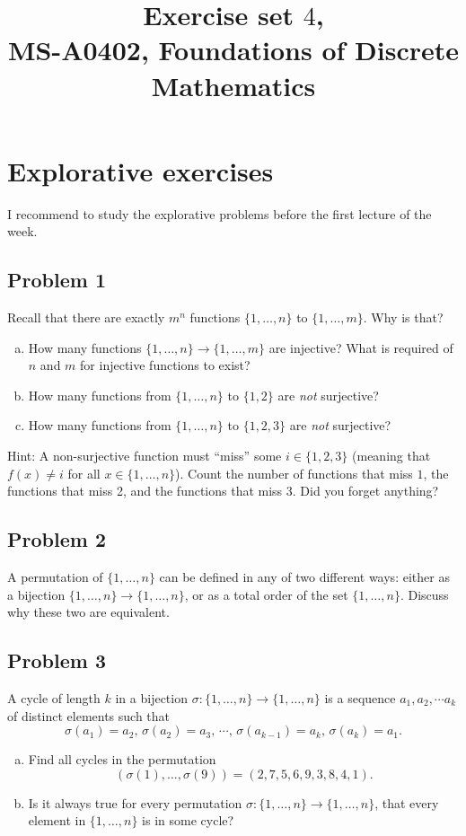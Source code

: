 \documentclass{amsart}
\title{Exercise set $4$, \\ MS-A0402, Foundations of Discrete Mathematics}
\theoremstyle{definition} \newtheorem*{definition}{Definition}
\theoremstyle{remark} \newtheorem*{ex}{Example}
\begin{document}
\hspace{-1cm}
\maketitle
 
\section*{Explorative exercises}
I recommend to study the explorative problems before the first lecture of the week.

\subsection*{Problem 1} 
Recall that there are exactly $m^n$ functions $\{1,\dots ,n\}$ to $\{1,\dots ,m\}$. Why is that?
\begin{enumerate}[a)]
\item How many functions $\{1,\dots ,n\}\to\{1,\dots ,m\}$ are injective? What is required of $n$ and $m$ for injective functions to exist?
\item How many functions from $\{1,\dots ,n\}$ to $\{1,2\}$ are {\em not} surjective?
\item How many functions from $\{1,\dots ,n\}$ to $\{1,2,3\}$ are {\em not} surjective? 
\end{enumerate}

Hint: A non-surjective function must ``miss'' some $i\in\{1,2,3\}$ (meaning that $f(x)\neq i$ for all $x\in \{1,\dots ,n\}$). Count the number of functions that miss $1$, the functions that miss 2, and the functions that miss 3. Did you forget anything?

\subsection*{Problem 2} 
A permutation of $\{1,\dots, n \}$ can be defined in any of two different ways: either as a bijection $\{1,\dots, n \}\to \{1,\dots, n \}$, or as a total order of the set $\{1,\dots, n \}$. Discuss why these two are equivalent.


\subsection*{Problem 3} 
A cycle of length $k$ in a bijection $\sigma: \{1,\dots, n \}\to \{1,\dots, n \}$ is a sequence $a_1, a_2, \cdots a_k$ of distinct elements such that $$\sigma(a_1)=a_2,\,\sigma(a_2)=a_3,\,\cdots  ,\, \sigma(a_{k-1})=a_k,\, \sigma(a_k)=a_1.$$
\begin{enumerate}[a)]
\item  Find all cycles in the permutation $$(\sigma(1), \dots , \sigma(9))=(2,7,5,6,9,3,8,4,1).$$
\item  Is it always true for every permutation $\sigma: \{1,\dots, n \}\to \{1,\dots, n \}$, that every element in $\{1,\dots, n\}$ is in some cycle?
\end{enumerate}
\end{document}
